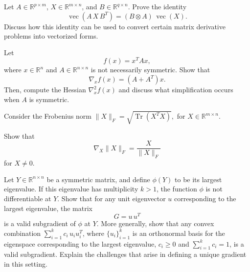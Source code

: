 \begin{exercise}
   Let $A\in\mathbb{R}^{p\times m}$, $X\in\mathbb{R}^{m\times n}$, and $B\in\mathbb{R}^{q\times n}$. Prove the identity
   \[
      \operatorname{vec}(A\,X\,B^T) = (B \otimes A)\,\operatorname{vec}(X).
   \]
   Discuss how this identity can be used to convert certain matrix derivative problems into vectorized forms.
\end{exercise}
\begin{exercise}
   Let 
   \[
      f(x) = x^T A x,
   \]
   where $x\in\mathbb{R}^n$ and $A\in\mathbb{R}^{n\times n}$ is not necessarily symmetric. Show that
   \[
      \nabla_x f(x) = (A + A^T)x.
   \]
   Then, compute the Hessian $\nabla^2_x f(x)$ and discuss what simplification occurs when $A$ is symmetric.
\end{exercise}
\begin{exercise}
   Consider the Frobenius norm
   \(
      \|X\|_F = \sqrt{\operatorname{Tr}(X^T X)},
   \)
   for $X\in\mathbb{R}^{m\times n}$.

   Show that
   \[
      \nabla_X \|X\|_F = \frac{X}{\|X\|_F}
   \]
   for $X\neq 0$.
\end{exercise}
\begin{exercise}
   Let $Y\in\mathbb{R}^{n\times n}$ be a symmetric matrix, and define $\phi(Y)$ to be its largest eigenvalue. If this eigenvalue has multiplicity $k>1$, the function $\phi$ is not differentiable at $Y$. Show that for any unit eigenvector $u$ corresponding to the largest eigenvalue, the matrix
   \[
      G = u\,u^T
   \]
   is a valid subgradient of $\phi$ at $Y$. More generally, show that any convex combination $\sum_{i=1}^k c_i\, u_i u_i^T$, where $\{u_i\}_{i=1}^k$ is an orthonormal basis for the eigenspace corresponding to the largest eigenvalue, $c_i \ge 0$ and $\sum_{i=1}^k c_i = 1$, is a valid subgradient. Explain the challenges that arise in defining a unique gradient in this setting.
\end{exercise}
